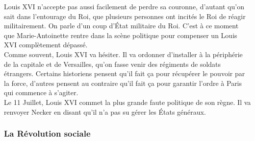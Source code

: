 \documentclass[10pt, a4paper, openany]{book}
\begin{document}
Louis XVI n'accepte pas aussi facilement de perdre sa couronne, d'autant qu'on sait dans l'entourage du Roi, que plusieurs personnes ont incités le Roi de réagir militairement. On parle d'un coup d'État militaire du Roi. C'est à ce moment que Marie-Antoinette rentre dans la scène politique pour compenser un Louis XVI complètement dépassé. \\
Comme souvent, Louis XVI va hésiter. Il va ordonner d'installer à la périphérie de la capitale et de Versailles, qu'on fasse venir des régiments de soldats étrangers. Certains historiens pensent qu'il fait ça pour récupérer le pouvoir par la force, d'autres pensent au contraire qu'il fait ça pour garantir l'ordre à Paris qui commence à s'agiter. \\
Le 11 Juillet, Louis XVI commet la plus grande faute politique de son règne. Il va renvoyer Necker en disant qu'il n'a pas su gérer les États généraux. 


















\subsubsection{La Révolution sociale}
\end{document}
